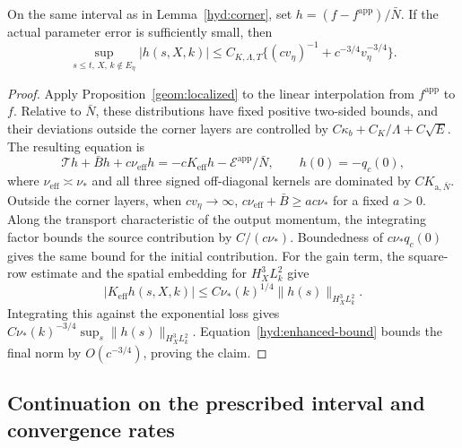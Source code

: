 \begin{lemma}\label{hyd:bulk}
 On the same interval as in Lemma~\ref{hyd:corner}, set
 $h=(f-f^{\mathrm{app}})/\bar N$. If the actual parameter error is
 sufficiently small, then
 \begin{equation}\label{hyd:bulk-bound}
 \sup_{s\le t,\,X,\,k\notin E_\eta}|h(s,X,k)|
 \le C_{K,\Lambda,T}\{(cv_\eta)^{-1}
                           +c^{-3/4}v_\eta^{-3/4}\}.
 \end{equation}
\end{lemma}

\begin{proof}
 Apply Proposition~\ref{geom:localized} to the linear interpolation
 from $f^{\mathrm{app}}$ to $f$. Relative to $\bar N$, these distributions
 have fixed positive two-sided bounds, and their deviations outside
 the corner layers are controlled by
 $C\kappa_b+C_K/\Lambda+C\sqrt E$. The resulting equation is
 \[
 \mathcal Th+\bar B h+c\nu_{\mathrm{eff}}h
       =-cK_{\mathrm{eff}}h-\mathcal E^{\mathrm{app}}/\bar N,
 \qquad h(0)=-q_c(0),
 \]
 where $\nu_{\mathrm{eff}}\asymp\nu_*$ and all three signed
 off-diagonal kernels are dominated by $C K_{\mathrm a,\bar N}$.
 Outside the corner layers, when $cv_\eta\to\infty$,
 $c\nu_{\mathrm{eff}}+\bar B\ge ac\nu_*$ for a fixed $a>0$.
 Along the transport characteristic of the output momentum, the
 integrating factor bounds the source contribution by $C/(c\nu_*)$.
 Boundedness of $c\nu_*q_c(0)$ gives the same bound for the initial
 contribution. For the gain term, the square-row estimate and the
 spatial embedding for $H_X^3L_k^2$ give
 \[
 |K_{\mathrm{eff}}h(s,X,k)|
       \le C\nu_*(k)^{1/4}\|h(s)\|_{H_X^3L_k^2}.
 \]
 Integrating this against the exponential loss gives
 $C\nu_*(k)^{-3/4}\sup_s\|h(s)\|_{H_X^3L_k^2}$.
 Equation~\eqref{hyd:enhanced-bound} bounds the final norm by
 $O(c^{-3/4})$, proving the claim.
\end{proof}

\subsection{Continuation on the prescribed interval and convergence rates}
\label{hyd:completion-section}

